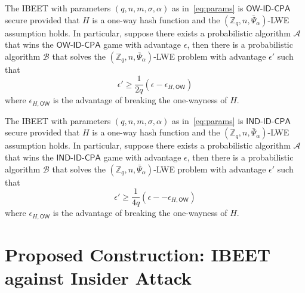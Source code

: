 \documentclass[runningheads]{llncs}
\def\ZZ{\mathbb{Z}}
\def\cal{\mathcal}
\def\OW{\textsf{OW-ID-CPA}}
\def\IND{\textsf{IND-ID-CPA}}
\def\a{\alpha}
\begin{document}
	\begin{theorem}\label{thm:OW}
		The IBEET with parameters $(q,n,m,\sigma,\alpha)$ as in~\eqref{eq:params} is  $\OW$ secure provided that $H$ is a one-way hash function and the $(\ZZ_q,n,\bar\Psi_\a)$-LWE assumption holds. In particular, suppose there exists a probabilistic algorithm $\cal{A}$ that wins the $\OW$ game with advantage $\epsilon$, then there is a probabilistic algorithm $\cal{B}$ that solves the $(\ZZ_q,n,\bar\Psi_\a)$-LWE problem with advantage $\epsilon'$ such that 
		$$\epsilon'\geq \frac{1}{2q}\left(\epsilon-\epsilon_{H,\mathsf{OW}}\right)$$
	where $\epsilon_{H,\mathsf{OW}}$ is the advantage of breaking the one-wayness of $H$.
	\end{theorem}
	
	\begin{theorem}\label{thm:IND}
		The IBEET with parameters $(q,n,m,\sigma,\alpha)$ as in~\eqref{eq:params}  is $\IND$ secure provided that $H$ is a one-way hash function and the $(\ZZ_q,n,\bar\Psi_\a)$-LWE assumption holds. In particular, suppose there exists a probabilistic algorithm $\cal{A}$ that wins the $\IND$ game with advantage $\epsilon$, then there is a probabilistic algorithm $\cal{B}$ that solves the $(\ZZ_q,n,\bar\Psi_\a)$-LWE problem with advantage $\epsilon'$ such that
		$$\epsilon'\geq \frac{1}{4q}\left(\epsilon--\epsilon_{H,\mathsf{OW}}\right)$$
		where $\epsilon_{H,\mathsf{OW}}$ is the advantage of breaking the one-wayness of $H$.
	\end{theorem}

	
	\section{Proposed Construction: IBEET against Insider Attack}
\end{document}
